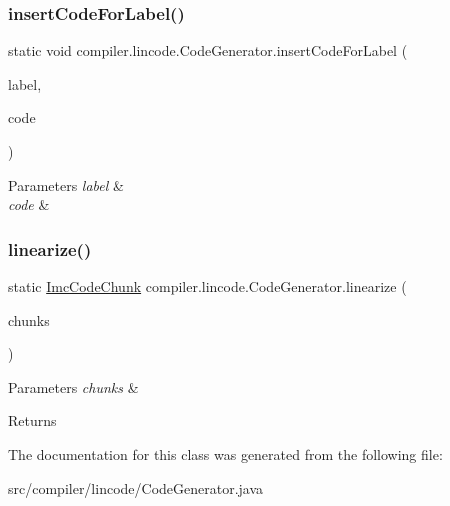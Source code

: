\subsubsection{\texorpdfstring{insert\+Code\+For\+Label()}{insertCodeForLabel()}}
{\footnotesize\ttfamily static void compiler.\+lincode.\+Code\+Generator.\+insert\+Code\+For\+Label (\begin{DoxyParamCaption}\item[{\hyperlink{classcompiler_1_1frames_1_1_frm_label}{Frm\+Label}}]{label,  }\item[{\hyperlink{classcompiler_1_1imcode_1_1_imc_code_chunk}{Imc\+Code\+Chunk}}]{code }\end{DoxyParamCaption})\hspace{0.3cm}{\ttfamily [static]}}


\begin{DoxyParams}{Parameters}
{\em label} & \\
\hline
{\em code} & \\
\hline
\end{DoxyParams}
\mbox{\label{classcompiler_1_1lincode_1_1_code_generator_ab7ec8e2a5e4ddc174373d321d76c4759}} 
\subsubsection{\texorpdfstring{linearize()}{linearize()}}
{\footnotesize\ttfamily static \hyperlink{classcompiler_1_1imcode_1_1_imc_code_chunk}{Imc\+Code\+Chunk} compiler.\+lincode.\+Code\+Generator.\+linearize (\begin{DoxyParamCaption}\item[{Linked\+List$<$ \hyperlink{classcompiler_1_1imcode_1_1_imc_chunk}{Imc\+Chunk} $>$}]{chunks }\end{DoxyParamCaption})\hspace{0.3cm}{\ttfamily [static]}}


\begin{DoxyParams}{Parameters}
{\em chunks} & \\
\hline
\end{DoxyParams}
\begin{DoxyReturn}{Returns}

\end{DoxyReturn}


The documentation for this class was generated from the following file\+:\begin{DoxyCompactItemize}
\item 
src/compiler/lincode/Code\+Generator.\+java\end{DoxyCompactItemize}
